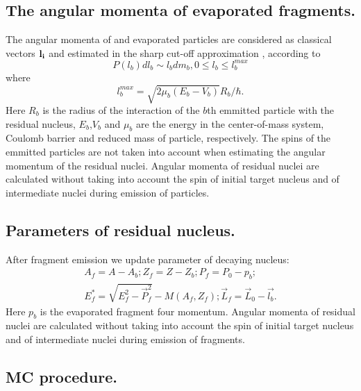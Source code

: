 \subsection{The angular momenta of 
evaporated fragments.}
 
\hspace{1.0em} The angular momenta of and evaporated particles
are considered as classical vectors ${\bf l_i}$ and estimated in the sharp
cut-off approximation \cite{IT69}, \cite{IT73} according to 
\begin{equation}
\label{PCS22}P(l_b)dl_b \sim l_bdm_b, 0 \leq l_b \leq l_b^{max}
\end{equation}
where
\begin{equation}
\label{PCS23} l_b^{max}=\sqrt{2\mu_b(E_b - V_b)}R_b/\hbar.
\end{equation}
Here $R_b$ is the radius of the interaction of the $b$th 
emmitted particle with the 
residual nucleus, $E_b$,$V_b$ and $\mu_b$ are the energy 
in the center-of-mass system,
Coulomb barrier and reduced mass of particle, respectively. 
The spins of the emmitted 
particles are not taken into account when estimating the 
angular momentum of the
residual nuclei. 
Angular momenta of residual nuclei are calculated 
without taking into
account the spin of initial target nucleus and of 
intermediate nuclei during emission
of particles.

\subsection{Parameters of residual nucleus.}

\hspace{1.0em}After fragment emission we  update parameter
of decaying nucleus:
\begin{equation}
\label{PCS24} 
\begin{array}{c}
A_f=A-A_b; Z_f=Z-Z_b; P_f = P_0 - p_b; \\ 
E_f^{*}=\sqrt{E_f^2-\vec{P}^2_f} - M(A_f,Z_f); \vec{L}_f = \vec{L}_0-\vec{l_b}. 
\end{array}
\end{equation}
Here $p_b$ is the evaporated fragment four momentum.
Angular momenta of residual nuclei are calculated without taking into
account the spin of initial target nucleus and
 of intermediate nuclei during emission
of fragments.

\subsection{MC procedure.}

